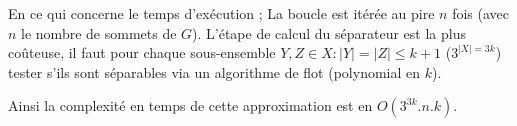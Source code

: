 En ce qui concerne le temps d'exécution ;
La boucle est itérée au pire $n$ fois (avec $n$ le nombre de sommets de $G$).%
L'étape de calcul du séparateur est la plus coûteuse, il faut pour 
chaque sous-ensemble $Y,Z \in X : |Y| = |Z| \leq k + 1$ ($3^{|X| = 3k}$) tester
s'ils sont séparables via un algorithme de flot (polynomial en $k$).

Ainsi la complexité en temps de cette approximation est en $O(3^{3k}.n.k)$.

